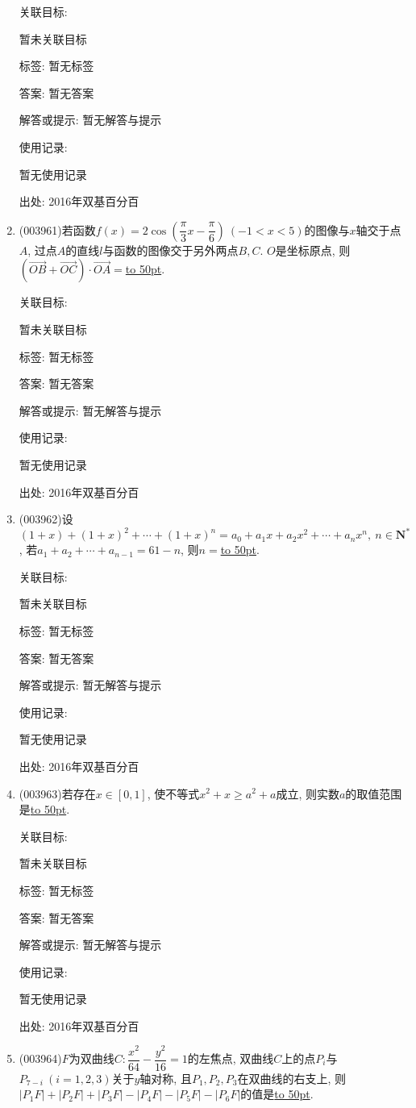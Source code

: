 \documentclass[10pt,a4paper]{article}
\newcommand{\blank}[1]{\underline{\hbox to #1pt{}}}
\begin{document}
\begin{enumerate}[1.]
关联目标:

暂未关联目标



标签: 暂无标签

答案: 暂无答案

解答或提示: 暂无解答与提示

使用记录:

暂无使用记录


出处: 2016年双基百分百
\item { (003961)}若函数$f(x)=2\cos\left(\dfrac{\pi}{3}x-\dfrac{\pi}{6}\right) \ (-1<x<5)$的图像与$x$轴交于点$A$, 过点$A$的直线$l$与函数的图像交于另外两点$B,C$. $O$是坐标原点, 则$(\overrightarrow{OB}+\overrightarrow{OC})\cdot\overrightarrow{OA}=$\blank{50}.


关联目标:

暂未关联目标



标签: 暂无标签

答案: 暂无答案

解答或提示: 暂无解答与提示

使用记录:

暂无使用记录


出处: 2016年双基百分百
\item { (003962)}设$(1+x)+(1+x)^2+\cdots+(1+x)^n=a_0+a_1x+a_2x^2+\cdots+a_nx^n, \ n\in \mathbf{N}^*$, 若$a_1+a_2+\cdots+a_{n-1}=61-n$, 则$n=$\blank{50}.


关联目标:

暂未关联目标



标签: 暂无标签

答案: 暂无答案

解答或提示: 暂无解答与提示

使用记录:

暂无使用记录


出处: 2016年双基百分百
\item { (003963)}若存在$x\in [0,1]$, 使不等式$x^2+x\ge a^2+a$成立, 则实数$a$的取值范围是\blank{50}.


关联目标:

暂未关联目标



标签: 暂无标签

答案: 暂无答案

解答或提示: 暂无解答与提示

使用记录:

暂无使用记录


出处: 2016年双基百分百
\item { (003964)}$F$为双曲线$C: \dfrac{x^2}{64}-\dfrac{y^2}{16}=1$的左焦点, 双曲线$C$上的点$P_i$与$P_{7-i} \ (i=1,2,3)$关于$y$轴对称, 且$P_1,P_2,P_3$在双曲线的右支上, 则$|P_1F|+|P_2F|+|P_3F|-|P_4F|-|P_5F|-|P_6F|$的值是\blank{50}.



\end{enumerate}
\end{document}
